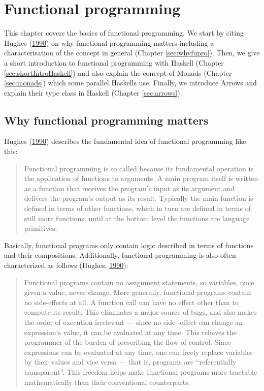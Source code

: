 \documentclass[paper=A4,twoside=true,openright,parskip=full,chapterprefix=true,headings=normal,bibliography=totoc,listof=totoc,titlepage=on,captions=tableabove,draft=false,british]{scrreprt}%
\begin{document}
\hypertarget{functional-programming}{%
\section{Functional programming}\label{functional-programming}}

\label{sec:fuproHaskell}

This chapter covers the basics of functional programming. We start by
citing Hughes
(\protect\hyperlink{ref-Hughes:1990:WFP:119830.119832}{1990}) on why
functional programming matters including a characterisation of the
concept in general (Chapter \ref{sec:whyfupro}). Then, we give a short
introduction to functional programming with Haskell (Chapter
\ref{sec:shortIntroHaskell}) and also explain the concept of Monads
(Chapter \ref{sec:monads}) which some parallel Haskells use. Finally, we
introduce Arrows and explain their type class in Haskell (Chapter
\ref{sec:arrows}).

\hypertarget{why-functional-programming-matters}{%
\subsection{Why functional programming
matters}\label{why-functional-programming-matters}}

\label{sec:whyfupro}

Hughes (\protect\hyperlink{ref-Hughes:1990:WFP:119830.119832}{1990})
describes the fundamental idea of functional programming like this:

\begin{quote}
Functional programming is so called because its fundamental operation is
the application of functions to arguments. A main program itself is
written as a function that receives the program's input as its argument
and delivers the program's output as its result. Typically the main
function is defined in terms of other functions, which in turn are
defined in terms of still more functions, until at the bottom level the
functions are language primitives.
\end{quote}

Basically, functional programs only contain logic described in terms of
functions and their compositions. Additionally, functional programming
is also often characterized as follows (Hughes,
\protect\hyperlink{ref-Hughes:1990:WFP:119830.119832}{1990}):

\begin{quote}
Functional programs contain no assignment statements, so variables, once
given a value, never change. More generally, functional programs contain
no side-effects at all. A function call can have no effect other than to
compute its result. This eliminates a major source of bugs, and also
makes the order of execution irrelevant --- since no side- effect can
change an expression's value, it can be evaluated at any time. This
relieves the programmer of the burden of prescribing the flow of
control. Since expressions can be evaluated at any time, one can freely
replace variables by their values and vice versa --- that is, programs
are ``referentially transparent''. This freedom helps make functional
programs more tractable mathematically than their conventional
counterparts.
\end{quote}
\end{document}
